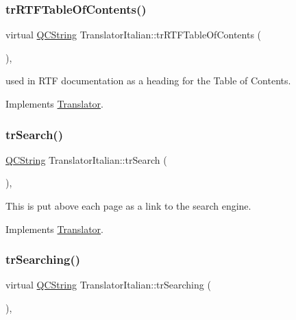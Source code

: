 \subsubsection{\texorpdfstring{trRTFTableOfContents()}{trRTFTableOfContents()}}
{\footnotesize\ttfamily virtual \mbox{\hyperlink{class_q_c_string}{Q\+C\+String}} Translator\+Italian\+::tr\+R\+T\+F\+Table\+Of\+Contents (\begin{DoxyParamCaption}{ }\end{DoxyParamCaption})\hspace{0.3cm}{\ttfamily [inline]}, {\ttfamily [virtual]}}

used in R\+TF documentation as a heading for the Table of Contents. 

Implements \mbox{\hyperlink{class_translator}{Translator}}.

\mbox{\label{class_translator_italian_a401d42c1892e95d150e4f7a05bb0ebd7}} 
\subsubsection{\texorpdfstring{trSearch()}{trSearch()}}
{\footnotesize\ttfamily \mbox{\hyperlink{class_q_c_string}{Q\+C\+String}} Translator\+Italian\+::tr\+Search (\begin{DoxyParamCaption}{ }\end{DoxyParamCaption})\hspace{0.3cm}{\ttfamily [inline]}, {\ttfamily [virtual]}}

This is put above each page as a link to the search engine. 

Implements \mbox{\hyperlink{class_translator}{Translator}}.

\mbox{\label{class_translator_italian_aa277a137695fe86514bea76d89476e25}} 
\subsubsection{\texorpdfstring{trSearching()}{trSearching()}}
{\footnotesize\ttfamily virtual \mbox{\hyperlink{class_q_c_string}{Q\+C\+String}} Translator\+Italian\+::tr\+Searching (\begin{DoxyParamCaption}{ }\end{DoxyParamCaption})\hspace{0.3cm}{\ttfamily [inline]}, {\ttfamily [virtual]}}

